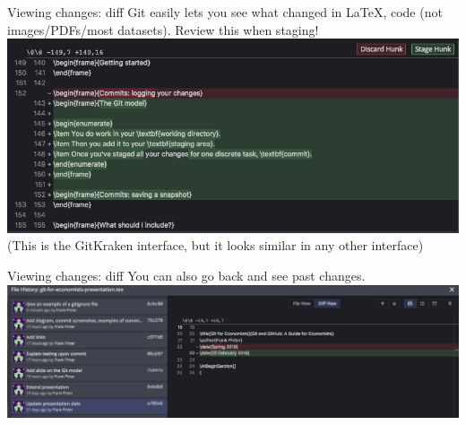 \documentclass{beamer}
\begin{document}
\begin{frame}{Viewing changes: diff}
Git easily lets you see what changed in \LaTeX, code (not images/PDFs/most datasets). Review this when staging!
\includegraphics[width=\textwidth]{screenshots/diff.png}
{\small (This is the GitKraken interface, but it looks similar in any other interface)}
\end{frame}

\begin{frame}{Viewing changes: diff}
You can also go back and see past changes.
\includegraphics[width=\textwidth]{screenshots/history-diff.png}
\end{frame}
\end{document}
